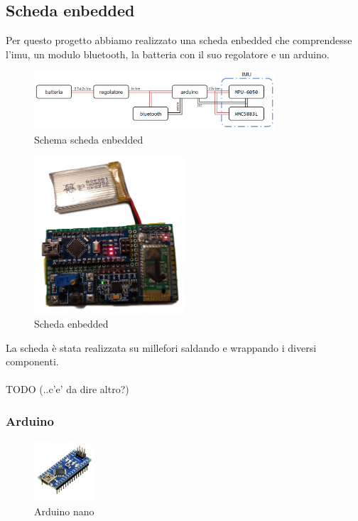\documentclass[10pt,a4paper]{article}
\begin{document}
\subsection{Scheda enbedded}
Per questo progetto abbiamo realizzato una scheda enbedded che comprendesse l'imu, un modulo bluetooth, la batteria con il suo regolatore e un arduino.

\begin{figure}[h]
	\centering
	\vspace{-10pt}
	\includegraphics[width=0.80\textwidth]{scheda.png}
	\vspace{-10pt}
	\caption{Schema scheda enbedded}
	\label{fig:schema_scheda}
\end{figure}

\begin{figure}[h]
	\centering
	\vspace{-10pt}
	\includegraphics[width=0.50\textwidth]{scheda.jpg}
	\vspace{-10pt}
	\caption{Scheda enbedded}
	\label{fig:scheda}
\end{figure}
La scheda \`e stata realizzata su millefori saldando e wrappando i diversi componenti.
\\
\\
TODO
(..c'e' da dire altro?)

\subsubsection{Arduino}

\begin{figure}
	\centering
	\vspace{-30pt}
	\includegraphics[width=0.2\textwidth]{arduino.jpg}
	\vspace{-30pt}
	\caption{Arduino nano}
	\label{fig:arduino_nano}
	\vspace{0pt}
\end{figure}
\end{document}

